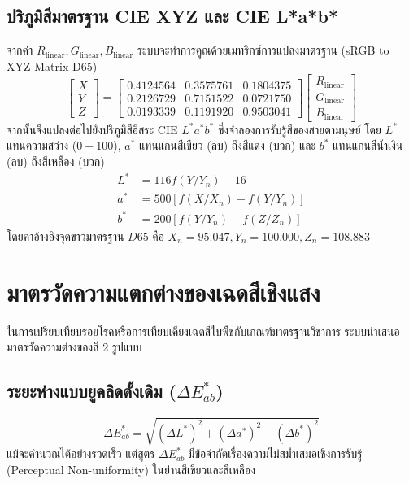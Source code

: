 \subsection{ปริภูมิสีมาตรฐาน CIE XYZ และ CIE L*a*b*}
จากค่า $R_{\text{linear}}, G_{\text{linear}}, B_{\text{linear}}$ ระบบจะทำการคูณด้วยเมทริกซ์การแปลงมาตรฐาน (sRGB to XYZ Matrix D65)
\begin{equation}
  \begin{bmatrix} X \\ Y \\ Z \end{bmatrix} = \begin{bmatrix}
    0.4124564 & 0.3575761 & 0.1804375 \\
    0.2126729 & 0.7151522 & 0.0721750 \\
    0.0193339 & 0.1191920 & 0.9503041
  \end{bmatrix} \begin{bmatrix} R_{\text{linear}} \\ G_{\text{linear}} \\ B_{\text{linear}} \end{bmatrix}
\end{equation}
จากนั้นจึงแปลงต่อไปยังปริภูมิสีอิสระ $\text{CIE } L^*a^*b^*$ ซึ่งจำลองการรับรู้สีของสายตามนุษย์ โดย $L^*$ แทนความสว่าง ($0 - 100$), $a^*$ แทนแกนสีเขียว (ลบ) ถึงสีแดง (บวก) และ $b^*$ แทนแกนสีน้ำเงิน (ลบ) ถึงสีเหลือง (บวก)
\begin{align}
  L^* &= 116 f(Y/Y_n) - 16 \\
  a^* &= 500 \left[ f(X/X_n) - f(Y/Y_n) \right] \\
  b^* &= 200 \left[ f(Y/Y_n) - f(Z/Z_n) \right]
\end{align}
โดยค่าอ้างอิงจุดขาวมาตรฐาน $D65$ คือ $X_n = 95.047, Y_n = 100.000, Z_n = 108.883$

\section{มาตรวัดความแตกต่างของเฉดสีเชิงแสง}
ในการเปรียบเทียบรอยโรคหรือการเทียบเคียงเฉดสีใบพืชกับเกณฑ์มาตรฐานวิชาการ ระบบนำเสนอมาตรวัดความต่างของสี 2 รูปแบบ

\subsection{ระยะห่างแบบยูคลิดดั้งเดิม ($\Delta E^*_{ab}$)}
\begin{equation}
  \Delta E^*_{ab} = \sqrt{(\Delta L^*)^2 + (\Delta a^*)^2 + (\Delta b^*)^2}
\end{equation}
แม้จะคำนวณได้อย่างรวดเร็ว แต่สูตร $\Delta E^*_{ab}$ มีข้อจำกัดเรื่องความไม่สม่ำเสมอเชิงการรับรู้ (Perceptual Non-uniformity) ในย่านสีเขียวและสีเหลือง

